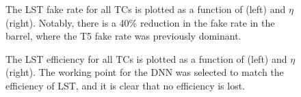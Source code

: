 \begin{figure}[!htb]
  \centering
  \qquad
  \caption{
      The LST fake rate for all TCs is plotted as a function of \pt (left) and $\eta$ (right).
      Notably, there is a 40\% reduction in the fake rate in the barrel, where the T5 fake rate was previously dominant.
  }
  \label{fig:t5dnn_fkr}
\end{figure}

\begin{figure}[!htb]
  \centering
  \qquad
  \caption{
      The LST efficiency for all TCs is plotted as a function of \pt (left) and $\eta$ (right).
      The working point for the DNN was selected to match the efficiency of LST, and it is clear that no efficiency is lost.
  }
  \label{fig:t5dnn_eff}
\end{figure}

